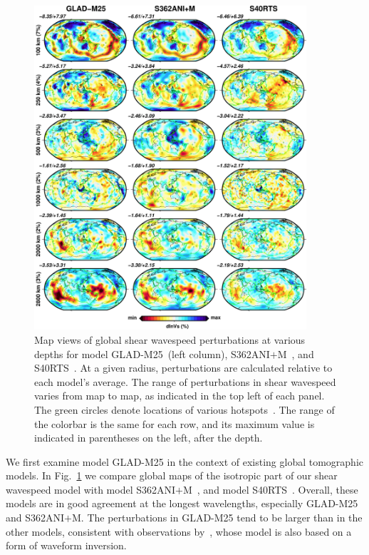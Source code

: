 \documentclass[extra,mreferee]{gji}
\begin{document}
\begin{figure}
  \centering
  \includegraphics[width=0.9\textwidth]{figures/depth_slice/globe_vs.pdf}
  \caption{\small{Map views of global shear wavespeed perturbations at various depths for  model
  GLAD-M25~(left column), S362ANI$+$M~\citep[middle column;][]{moulik2014anisotropic},
  and S40RTS~\citep[right column;][]{ritsema2011s40rts}.
  At a given radius,
  perturbations are calculated relative to each model's average.
  The range of perturbations in shear wavespeed varies from map to map, as indicated in the top left of each panel.
  The green circles denote locations of various
  hotspots~\citep{montelli2006catalogue}.
  The range of the colorbar is the same for each row,
  and its maximum value is indicated in parentheses on the left, after
  the depth.}}
  \label{fig:global-vs}
\end{figure}

We first examine model GLAD-M25 in the context of existing global tomographic models.
In Fig.~\ref{fig:global-vs} we compare global maps of the isotropic part of our
shear wavespeed model with model S362ANI$+$M~\citep{moulik2014anisotropic},
and model S40RTS~\citep{ritsema2011s40rts}.
Overall, these models are in good agreement
at the longest wavelengths, especially GLAD-M25 and S362ANI$+$M.
The perturbations in GLAD-M25 tend to be larger than in the other models,
consistent with observations by~\cite{french2014whole},
whose model is also based on a form of waveform inversion.
\end{document}
